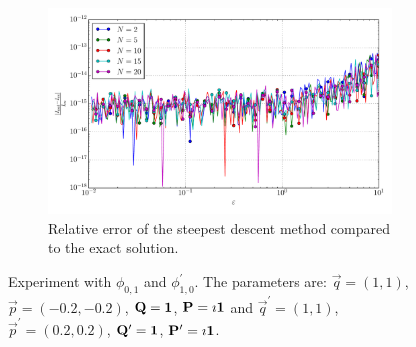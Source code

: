 \documentclass[a4paper,10pt]{article}
\begin{document}
\begin{figure}[ht!]
\begin{subfigure}[t]{0.5\linewidth}
    \includegraphics[width=\linewidth]{./plots/tp_2d_conv_eps_(0,1)_(1,0)_err_rel_nsd.pdf}
    \caption{Relative error of the steepest descent method compared to the exact solution.}
    \label{fig:tp_2d_conv_eps_01_10_err_nsd}
  \end{subfigure}
  \label{fig:tp_2d_conv_eps_01_10}
  \caption{Experiment with $\phi_{0,1}$ and $\phi_{1,0}^{\prime}$.
  The parameters are:
  $\vec{q} = (1, 1)$,
  $\vec{p} = (-0.2, -0.2)$,
  $\mathbf{Q} = \mathbf{1}$,
  $\mathbf{P} = \imath \mathbf{1}$
  and
  $\vec{q}^\prime = (1, 1)$,
  $\vec{p}^\prime = (0.2, 0.2)$,
  $\mathbf{Q}^\prime = \mathbf{1}$,
  $\mathbf{P}^\prime = \imath \mathbf{1}$.}
\end{figure}
\end{document}
